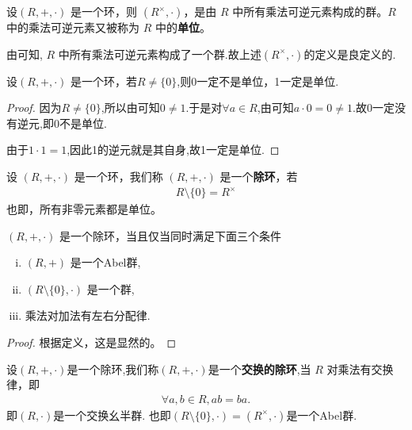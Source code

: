 \documentclass[../../main.tex]{subfiles}
\begin{document}
\begin{definition}[单位及所有单位构成的群]
设$(R, +, \cdot)$ 是一个环，则 $(R^\times, \cdot)$，是由 $R$ 中所有乘法可逆元素构成的群。$R$ 中的乘法可逆元素又被称为 $R$ 中的\textbf{单位}。 
\end{definition}
\begin{remark}
由可知, $R$ 中所有乘法可逆元素构成了一个群.故上述$(R^\times, \cdot)$的定义是良定义的.
\end{remark}

\begin{proposition}\label{proposition:非零环中0不是单位,1是单位}
设$(R, +, \cdot)$ 是一个环，若$R\ne \{0\}$,则0一定不是单位，1一定是单位.
\end{proposition}
\begin{proof}
因为$R\ne \{0\}$,所以由可知$0\ne 1$.于是对$\forall a\in R$,由可知$a\cdot 0=0\ne 1.$故0一定没有逆元,即0不是单位.

由于$1\cdot 1=1$,因此1的逆元就是其自身,故1一定是单位.

\end{proof}

\begin{definition}[除环]
设 $(R, +, \cdot)$ 是一个环，我们称 $(R, +, \cdot)$ 是一个\textbf{除环}，若
\begin{align*}
R\setminus\{0\} = R^\times
\end{align*}
也即，所有非零元素都是单位。 
\end{definition}

\begin{proposition}[除环的充要条件]\label{proposition:除环的充要条件}
$(R, +, \cdot)$ 是一个除环，当且仅当同时满足下面三个条件
\begin{enumerate}[(i)]
\item $(R, +)$  是一个Abel群,

\item $(R\setminus\{0\}, \cdot)$ 是一个群,

\item 乘法对加法有左右分配律.
\end{enumerate}
\end{proposition}
\begin{proof}
根据定义，这是显然的。

\end{proof}

\begin{definition}[交换的除环]
设$(R,+,\cdot)$是一个除环,我们称$(R,+,\cdot)$是一个\textbf{交换的除环},当 $R$ 对乘法有交换律，即
\begin{align*}
\forall a,b\in R, ab = ba.
\end{align*}
即$(R,\cdot)$是一个交换幺半群.
也即$(R\setminus\{0\}, \cdot)=(R^\times,\cdot)$是一个Abel群.
\end{definition}
\end{document}

